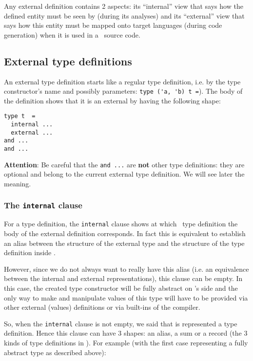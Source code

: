 Any external definition contains 2 aspects: its ``internal'' view that
says how the defined entity must be seen by \focalize (during its
analyses) and its ``external'' view that says how this entity must be
mapped onto target languages (during code generation) when it is used
in a \focalize\ source code.


\subsection{External type definitions}
\label{external-type-def-codegen-model}
An external type definition starts like a regular type definition,
i.e. by the type constructor's name and possibly parameters:
\lstinline!type ('a, 'b) t =!). The body of the definition shows that
it is an external by having the following shape:

{\footnotesize
\begin{lstlisting}
type t  =
  internal ...
  external ...
and ...
and ...
\end{lstlisting}}

{\bf Attention}: Be careful that the {\tt and ...} are {\bf not} other
type definitions: they are optional and belong to the current external
type definition. We will see later the meaning.

\subsubsection{The {\tt internal} clause}
For a type definition, the {\tt internal} clause shows at which
\focalize\ type definition the body of the external definition
corresponds. In fact this is equivalent to establish an alias between
the structure of the external type and the structure of the type
definition inside \focalize.

However, since we do not always want to really have this alias
(i.e. an equivalence between the internal and external
representations), this clause can be empty. In this case, the created
type constructor will be fully abstract on \focalize's side and the
only way to make and manipulate values of this type will have to be
provided via other external (values) definitions or via built-ins of
the compiler.

\medskip
So, when the {\tt internal} clause is not empty, we said that is
represented a type definition. Hence this clause can have 3 shapes: an
alias, a sum or a record (the 3 kinds of type definitions in
\focalize). For example (with the first case representing a fully
abstract type as described above):


